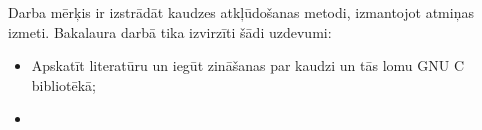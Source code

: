 ﻿
Darba mērķis ir izstrādāt kaudzes atkļūdošanas metodi, izmantojot atmiņas izmeti.
Bakalaura darbā tika izvirzīti šādi uzdevumi:
\begin{itemize}
	\item Apskatīt literatūru un iegūt zināšanas par kaudzi un tās lomu GNU C bibliotēkā;
    \item 

\end{itemize} 